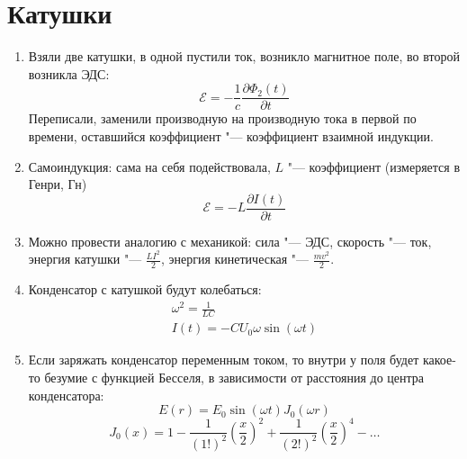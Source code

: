 \documentclass[10pt,a4paper]{article}
\begin{document}
\section{Катушки}
\begin{enumerate}
\item Взяли две катушки, в одной пустили ток, возникло магнитное поле, во второй возникла ЭДС:
\[ \mathcal{E} = -\frac1c \frac{\partial \Phi_2(t)}{\partial t} \]
Переписали, заменили производную на производную тока в первой по времени, оставшийся коэффициент "--- коэффициент взаимной индукции.
\item Самоиндукция: сама на себя подействовала, $L$ "--- коэффициент (измеряется в Генри, Гн)
\[ \mathcal{E} = -L \frac{\partial I(t)}{\partial t} \]
\item Можно провести аналогию с механикой: сила "--- ЭДС, скорость "--- ток, энергия катушки "--- $\frac{LI^2}{2}$, энергия кинетическая "--- $\frac{mv^2}{2}$.
\item Конденсатор с катушкой будут колебаться:
\begin{gather*}
\omega ^2 = \frac{1}{LC} \\
I(t) = -CU_0 \omega \sin(\omega t)
\end{gather*}
\item Если заряжать конденсатор переменным током, то внутри у поля будет какое-то безумие с функцией Бесселя, в зависимости от расстояния до центра конденсатора:
\[ E(r) = E_0\sin(\omega t) J_0(\omega r) \]
\[
J_0(x) = 1 - \frac{1}{(1!)^2} \left(\frac x 2\right) ^ 2 + \frac{1}{(2!)^2} \left(\frac x 2\right) ^ 4 - \dots
\]
\end{enumerate}
\end{document}

